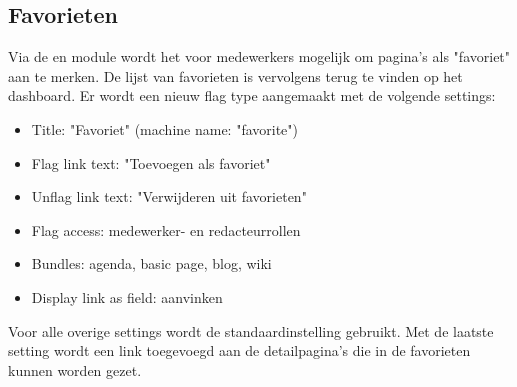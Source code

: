 \subsection{Favorieten}\label{favorieten}

Via de  en  module wordt het voor medewerkers mogelijk om pagina's als "favoriet" aan te merken. De lijst van favorieten is vervolgens terug te vinden op het dashboard. Er wordt een nieuw flag type aangemaakt met de volgende settings:
\begin{itemize}
\item Title: "Favoriet" (machine name: "favorite")
\item Flag link text: "Toevoegen als favoriet"
\item Unflag link text: "Verwijderen uit favorieten"
\item Flag access: medewerker- en redacteurrollen
\item Bundles: agenda, basic page, blog, wiki
\item Display link as field: aanvinken
\end{itemize}
Voor alle overige settings wordt de standaardinstelling gebruikt. Met de laatste setting wordt een link toegevoegd aan de detailpagina's die in de favorieten kunnen worden gezet.

